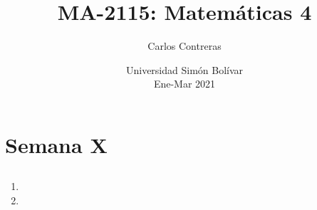 \documentclass[12pt,oneside]{book}
\title{\bf MA-2115: Matemáticas 4}
\author{Carlos Contreras}
\date{Universidad Simón Bolívar \\ Ene-Mar 2021}
\newcounter{weekpage}
\begin{document}









\chapter{Semana X}
\setcounter{weekpage}{1}
\thispagestyle{plainweek}


\section{}

\begin{enumerate}


\item 

\vspace{100pt}

\item 

 
\end{enumerate}


    
\end{document}
